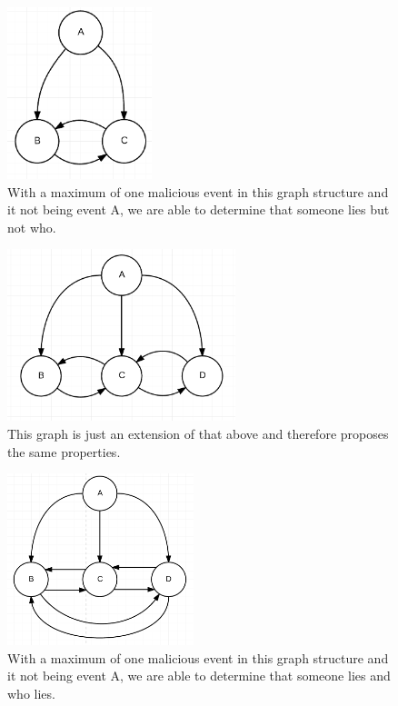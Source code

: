 \begin{figure}[H]
	\centering
	\includegraphics[height=5cm]{figures/GraphStructure_OneToTwo}
	\caption{With a maximum of one malicious event in this graph structure and it not being event A, we are able to determine that someone lies but not who.}
\end{figure}

\begin{figure}[H]
	\centering
	\includegraphics[height=5cm]{figures/GraphStructure_OneToTwoChain}
	\caption{This graph is just an extension of that above and therefore proposes the same properties.}
\end{figure}

\begin{figure}[H]
	\centering
	\includegraphics[height=5cm]{figures/GraphStructure_OneToThree}
	\caption{With a maximum of one malicious event in this graph structure and it not being event A, we are able to determine that someone lies and who lies.}
\end{figure}

